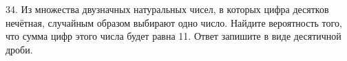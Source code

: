 34. Из множества двузначных натуральных чисел, в которых цифра десятков нечётная, случайным образом выбирают одно число. Найдите вероятность того, что сумма цифр этого числа будет равна 11. Ответ запишите в виде десятичной дроби.\\
